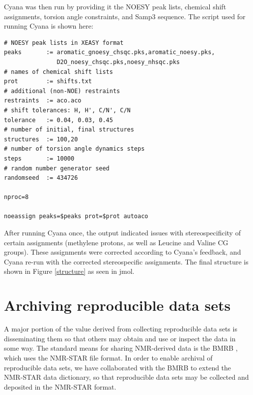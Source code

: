Cyana was then run by providing it the NOESY peak lists, chemical shift
assignments, torsion angle constraints, and Samp3 sequence.  The script
used for running Cyana is shown here:
\begin{verbatim}
# NOESY peak lists in XEASY format
peaks       := aromatic_gnoesy_chsqc.pks,aromatic_noesy.pks,
               D2O_noesy_chsqc.pks,noesy_nhsqc.pks
# names of chemical shift lists
prot        := shifts.txt                
# additional (non-NOE) restraints
restraints  := aco.aco                   
# shift tolerances: H, H', C/N', C/N
tolerance   := 0.04, 0.03, 0.45          
# number of initial, final structures
structures  := 100,20                    
# number of torsion angle dynamics steps
steps       := 10000                    
# random number generator seed
randomseed  := 434726                    

nproc=8

noeassign peaks=$peaks prot=$prot autoaco
\end{verbatim}
After running Cyana once, the output indicated issues with stereospecificity
of certain assignments (methylene protons, as well as Leucine and Valine
CG groups).  These assignments were corrected according to Cyana's feedback,
and Cyana re-run with the corrected stereospecific assignments.
The final structure is shown in Figure \ref{structure} as seen in jmol.




\section{Archiving reproducible data sets}
A major portion of the value derived from collecting reproducible data sets
is disseminating them so that others may obtain and use or inspect the data
in some way.  The standard means for sharing NMR-derived data is the BMRB
\cite{bmrb}, which uses the NMR-STAR file format.  In order to enable archival
of reproducible data sets, we have collaborated with the BMRB to extend the
NMR-STAR data dictionary, so that reproducible data sets may be collected and
deposited in the NMR-STAR format.

